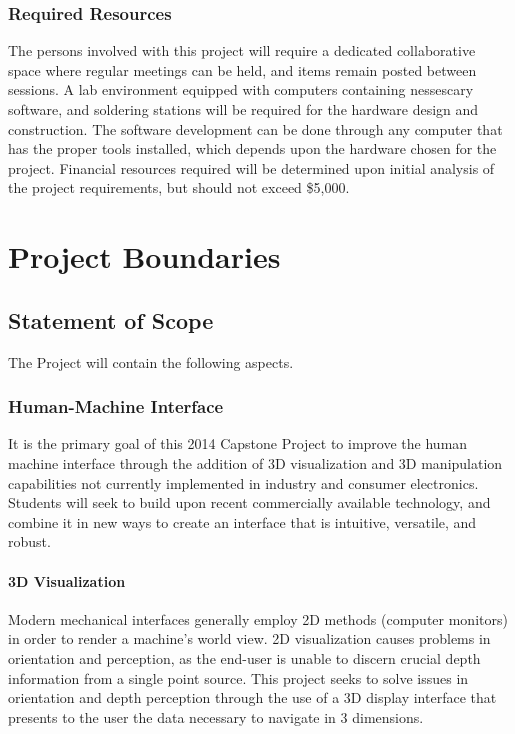 \documentclass[11pt]{report}
\begin{document}
\subsubsection{Required Resources}
\par The persons involved with this project will require a dedicated collaborative space where regular meetings can be held, and items remain posted between sessions. A lab environment equipped with computers containing nessescary software, and soldering stations will be required for the hardware design and construction. The software development can be done through any computer that has the proper tools installed, which depends upon the hardware chosen for the project. Financial resources required will be determined upon initial analysis of the project requirements, but should not exceed \$5,000.

\section{Project Boundaries}

\subsection{Statement of Scope}
The Project will contain the following aspects.

\subsubsection{Human-Machine Interface}
\par It is the primary goal of this 2014 Capstone Project to improve the human machine interface through the addition of 3D visualization and 3D manipulation capabilities not currently implemented in industry and consumer electronics. Students will seek to build upon recent commercially available technology, and combine it in new ways to create an interface that is intuitive, versatile, and robust.

\paragraph{3D Visualization}
Modern mechanical interfaces generally employ 2D methods (computer monitors) in order to render a machine's world view. 2D visualization causes problems in orientation and perception, as the end-user is unable to discern crucial depth information from a single point source. This project seeks to solve issues in orientation and depth perception through the use of a 3D display interface that presents to the user the data necessary to navigate in 3 dimensions.
\end{document}
